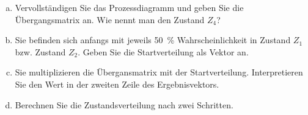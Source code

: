 \begin{exercise}
\begin{center}
    \end{center}
    \begin{enumerate}[a)]
      \item Vervollständigen Sie das Prozessdiagramm
            und geben Sie die Übergangsmatrix an.
            Wie nennt man den Zustand $Z_4$?
      \item Sie befinden sich anfangs mit jeweils
            \SI{50}{\percent} Wahrscheinlichkeit
            in Zustand $Z_1$ bzw. Zustand $Z_2$.
            Geben Sie die Startverteilung als
            Vektor an.
      \item Sie multiplizieren die Übergansmatrix mit
            der Startverteilung. Interpretieren Sie
            den Wert in der zweiten Zeile des
            Ergebnisvektors.
      \item Berechnen Sie die Zustandsverteilung nach
            zwei Schritten.
    \end{enumerate}
  \fi
\end{exercise}
